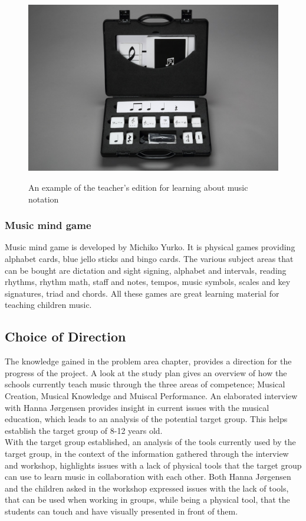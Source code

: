\begin{figure}[H]
	\centering
	\includegraphics[width=0.7\linewidth]{figure/Analysis/musicworkout}
	\label{fig:musicworkout}
	\caption{An example of the teacher's edition for learning about music notation}
\end{figure}

\subsubsection{Music mind game}
Music mind game is developed by Michiko Yurko. It is physical games providing alphabet cards, blue jello sticks and bingo cards. The various subject areas that can be bought are dictation and sight signing, alphabet and intervals, reading rhythms, rhythm math, staff and notes, tempos, music symbols, scales and key signatures, triad and chords. All these games are great learning material for teaching children music. 

  
\subsection{Choice of Direction}
The knowledge gained in the problem area chapter, provides a direction for the progress of the project. A look at the study plan gives an overview of how the schools currently teach music through the three areas of competence; Musical Creation, Musical Knowledge and Muiscal Performance. An elaborated interview with Hanna Jørgensen provides insight in current issues with the musical education, which leads to an analysis of the potential target group. This helps establish the target group of 8-12 years old.\\

With the target group established, an analysis of the tools currently used by the target group, in the context of the information gathered through the interview and workshop, highlights issues with a lack of physical tools that the target group can use to learn music in collaboration with each other. Both Hanna Jørgensen and the children asked in the workshop expressed issues with the lack of tools, that can be used when working in groups, while being a physical tool, that the students can touch and have visually presented in front of them.\\

